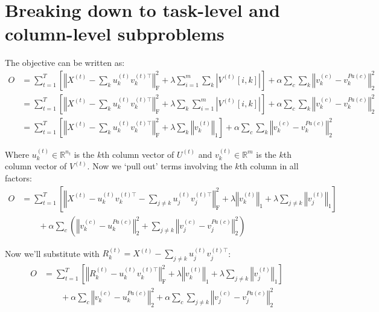 \documentclass{article}
\begin{document}
\medskip
\section*{Breaking down to task-level and column-level subproblems}

The objective can be written as:
\begin{align}
O &= 
\sum_{t=1}^T \left[
\left\Vert X^{(t)} - \sum_k u^{(t)}_{k} v^{(t)\top}_{k} \right\Vert_\text{F}^2 
+\lambda \sum_{i=1}^m \sum_k \left\lvert V^{(t)}[i,k] \right\rvert
\right]
+ \alpha \sum_c \sum_k \left\Vert v^{(c)}_{k} - v^{Pa(c)}_{k} \right\Vert_\text{2}^2  \\
 &= 
\sum_{t=1}^T \left[
\left\Vert X^{(t)} - \sum_k u^{(t)}_{k} v^{(t)\top}_{k} \right\Vert_\text{F}^2 
+ \lambda \sum_k \sum_{i=1}^m  \left\lvert V^{(t)}[i,k] \right\rvert
\right]
+ \alpha \sum_c \sum_k \left\Vert v^{(c)}_{k} - v^{Pa(c)}_{k} \right\Vert_\text{2}^2  \\
 &= 
\sum_{t=1}^T \left[
\left\Vert X^{(t)} - \sum_k u^{(t)}_{k} v^{(t)\top}_{k} \right\Vert_\text{F}^2 
+ \lambda \sum_k \left\Vert v_k^{(t)} \right\Vert_1
\right]
+ \alpha \sum_c \sum_k \left\Vert v^{(c)}_{k} - v^{Pa(c)}_{k} \right\Vert_\text{2}^2 \label{eqn:objective}
\end{align}

Where $u^{(t)}_{k} \in \mathbb{R}^{n_t}$ is the $k$th column vector of $U^{(t)}$ and  $v ^{(t)}_{k}  \in \mathbb{R}^m$ is the $k$th column vector of $V^{(t)}$. Now we `pull out' terms involving the $k$th column in all factors:
\begin{align}
O &= \sum_{t=1}^T \left[
\left\Vert 
X^{(t)} 
- u^{(t)}_{k} v^{(t)\top}_{k}
- \sum_{j\neq k} u^{(t)}_{j} v^{(t)\top}_{j} 
\right\Vert_\text{F}^2 
+\lambda \left\Vert v_k^{(t)} \right\Vert_1
+ \lambda \sum_{j \neq k} \left\Vert v_j^{(t)} \right\Vert_1 \right] \\
&\quad\quad+
\alpha \sum_c \left(
\left\Vert v^{(c)}_{k} - u^{Pa(c)}_{k} \right\Vert_\text{2}^2 
+ \sum_{j\neq k} \left\Vert v^{(c)}_{j} - v^{Pa(c)}_{j}  \right\Vert_\text{2}^2  
\right)
\end{align} 

Now we'll substitute with $R^{(t)}_k = X^{(t)} - \sum_{j\neq k} u^{(t)}_{j} v^{(t)\top}_{j}$:
\begin{align}
O &= \sum_{t=1}^T \left[
\left\Vert 
R_k^{(t)} 
- u^{(t)}_{k} v^{(t)\top}_{k}
\right\Vert_\text{F}^2 
+\lambda \left\Vert v_k^{(t)} \right\Vert_1
+ \lambda \sum_{j \neq k} \left\Vert v_j^{(t)} \right\Vert_1 \right] \\
&\quad\quad+
\alpha \sum_c \left\Vert v^{(c)}_{k} - u^{Pa(c)}_{k} \right\Vert_\text{2}^2 
+ \alpha \sum_c \sum_{j\neq k} \left\Vert v^{(c)}_{j} - v^{Pa(c)}_{j}  \right\Vert_\text{2}^2  
\end{align} 
\end{document}

